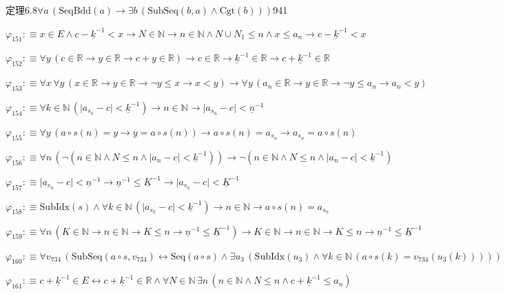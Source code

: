 \begin{fullproof}{定理6.8}{$\forall a\,(\mathrm{SeqBdd}(a) \to \exists b\,(\mathrm{SubSeq}(b,a) \land \mathrm{Cgt}(b)))$}{941}
\begin{abbrevlist}
\item $\varphi_{151} :\equiv x \in E \land c - \underline{k}^{-1} < x \to N \in \mathbb{N} \to n \in \mathbb{N} \land N \cup N_{1} \leq n \land x \leq a_{n} \to c - \underline{k}^{-1} < x$
\item $\varphi_{152} :\equiv \forall y\,(c \in \mathbb{R} \to y \in \mathbb{R} \to c + y \in \mathbb{R}) \to c \in \mathbb{R} \to \underline{k}^{-1} \in \mathbb{R} \to c + \underline{k}^{-1} \in \mathbb{R}$
\item $\varphi_{153} :\equiv \forall x\,\forall y\,(x \in \mathbb{R} \to y \in \mathbb{R} \to \neg y \leq x \to x < y) \to \forall y\,(a_{n} \in \mathbb{R} \to y \in \mathbb{R} \to \neg y \leq a_{n} \to a_{n} < y)$
\item $\varphi_{154} :\equiv \forall k \in \mathbb{N}\,(\lvert a_{s_{k}} - c \rvert < \underline{k}^{-1}) \to n \in \mathbb{N} \to \lvert a_{s_{n}} - c \rvert < \underline{n}^{-1}$
\item $\varphi_{155} :\equiv \forall y\,(a \circ s(n) = y \to y = a \circ s(n)) \to a \circ s(n) = a_{s_{n}} \to a_{s_{n}} = a \circ s(n)$
\item $\varphi_{156} :\equiv \forall n\,(\neg (n \in \mathbb{N} \land N \leq n \land \lvert a_{n} - c \rvert < \underline{k}^{-1})) \to \neg (n \in \mathbb{N} \land N \leq n \land \lvert a_{n} - c \rvert < \underline{k}^{-1})$
\item $\varphi_{157} :\equiv \lvert a_{s_{n}} - c \rvert < \underline{n}^{-1} \to \underline{n}^{-1} \leq \underline{K}^{-1} \to \lvert a_{s_{n}} - c \rvert < \underline{K}^{-1}$
\item $\varphi_{158} :\equiv \mathrm{SubIdx}(s) \land \forall k \in \mathbb{N}\,(\lvert a_{s_{k}} - c \rvert < \underline{k}^{-1}) \to n \in \mathbb{N} \to a \circ s(n) = a_{s_{n}}$
\item $\varphi_{159} :\equiv \forall n\,(K \in \mathbb{N} \to n \in \mathbb{N} \to K \leq n \to \underline{n}^{-1} \leq \underline{K}^{-1}) \to K \in \mathbb{N} \to n \in \mathbb{N} \to K \leq n \to \underline{n}^{-1} \leq \underline{K}^{-1}$
\item $\varphi_{160} :\equiv \forall v_{734}\,(\mathrm{SubSeq}(a \circ s,v_{734}) \leftrightarrow \mathrm{Seq}(a \circ s) \land \exists u_{3}\,(\mathrm{SubIdx}(u_{3}) \land \forall k \in \mathbb{N}\,(a \circ s(k) = v_{734}(u_{3}(k)))))$
\item $\varphi_{161} :\equiv c + \underline{k}^{-1} \in E \leftrightarrow c + \underline{k}^{-1} \in \mathbb{R} \land \forall N \in \mathbb{N}\,\exists n\,(n \in \mathbb{N} \land N \leq n \land c + \underline{k}^{-1} \leq a_{n})$

\end{abbrevlist}
\end{fullproof}
